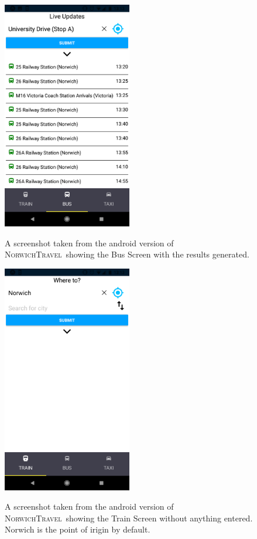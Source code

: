 \documentclass[cmpstyle]{ueacmpstyle}
\newcommand{\nt}{\textsc{NorwichTravel}}
\begin{document}
		\begin{figure}[h]
			\centering
			\includegraphics[height=10cm]{images/android-bus-2.png}\\
			\caption{A screenshot taken from the android version of \nt \ showing the Bus Screen with the results generated.}\label{fig:android-bus-2}
		\end{figure}
		\begin{figure}[h]
			\centering
			\includegraphics[height=10cm]{images/android-train-1.png}\\
			\caption{A screenshot taken from the android version of \nt \ showing the Train Screen without anything entered. Norwich is the point of irigin by default.}\label{fig:android-train-1}
		\end{figure}
\end{document}
